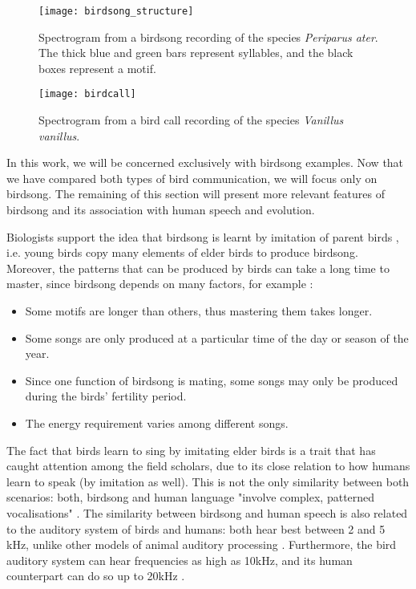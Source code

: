 \documentclass[../main.tex]{subfiles} \label{chapter_soa}
\begin{document}
\begin{figure}[t]
\texttt{[image: birdsong\_structure]}
\caption{Spectrogram from a birdsong recording of the species \emph{Periparus ater}. The thick blue and green bars represent syllables, and the black boxes represent a motif.}
\label{fig_birdsong_structure}
\end{figure}

\begin{figure}[t]
\texttt{[image: birdcall]}
\caption{Spectrogram from a bird call recording of the species \emph{Vanillus vanillus}.}
\label{fig_birdcall}
\end{figure}

\par In this work, we will be concerned exclusively with birdsong examples. Now that we have compared both types of bird communication, we will focus only on birdsong. The remaining of this section will present more relevant features of birdsong and its association with human speech and evolution.
\par Biologists support the idea that birdsong is learnt by imitation of parent birds \cite{Berwick2013}, i.e. young birds copy many elements of elder birds to produce birdsong. Moreover, the patterns that can be produced by birds can take a long time to master, since birdsong depends on many factors, for example \cite{Naguib2014}: 
\begin{itemize}
\item Some motifs are longer than others, thus mastering them takes longer.
\item Some songs are only produced at a particular time of the day or season of the year.
\item Since one function of birdsong is mating, some songs may only be produced during the birds' fertility period.
\item The energy requirement varies among different songs.
\end{itemize}
\par The fact that birds learn to sing by imitating elder birds is a trait that has caught attention among the field scholars, due to its close relation to how humans learn to speak (by imitation as well). This is not the only similarity between both scenarios: both, birdsong and human language "involve complex, patterned vocalisations" \cite{Berwick2013} \cite{Naguib2014}. The similarity between birdsong and human speech is also related to the auditory system of birds and humans: both hear best between 2 and 5 kHz, unlike other models of animal auditory processing \cite{Snowdon2013}. Furthermore, the bird auditory system can hear frequencies as high as 10kHz, and its human counterpart can do so up to 20kHz \cite{Snowdon2013}.
\end{document}
